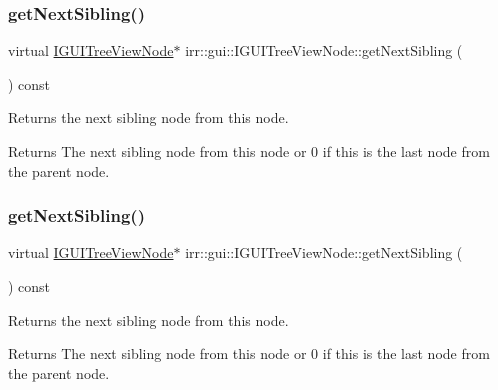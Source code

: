 \subsubsection{\texorpdfstring{get\+Next\+Sibling()}{getNextSibling()}\hspace{0.1cm}{\footnotesize\ttfamily [1/2]}}
{\footnotesize\ttfamily virtual \hyperlink{classirr_1_1gui_1_1IGUITreeViewNode}{I\+G\+U\+I\+Tree\+View\+Node}$\ast$ irr\+::gui\+::\+I\+G\+U\+I\+Tree\+View\+Node\+::get\+Next\+Sibling (\begin{DoxyParamCaption}{ }\end{DoxyParamCaption}) const\hspace{0.3cm}{\ttfamily [pure virtual]}}



Returns the next sibling node from this node. 

\begin{DoxyReturn}{Returns}
The next sibling node from this node or 0 if this is the last node from the parent node. 
\end{DoxyReturn}
\mbox{\label{classirr_1_1gui_1_1IGUITreeViewNode_a5f54e1386055ad0b45775ebefb1b5600}} 
\subsubsection{\texorpdfstring{get\+Next\+Sibling()}{getNextSibling()}\hspace{0.1cm}{\footnotesize\ttfamily [2/2]}}
{\footnotesize\ttfamily virtual \hyperlink{classirr_1_1gui_1_1IGUITreeViewNode}{I\+G\+U\+I\+Tree\+View\+Node}$\ast$ irr\+::gui\+::\+I\+G\+U\+I\+Tree\+View\+Node\+::get\+Next\+Sibling (\begin{DoxyParamCaption}{ }\end{DoxyParamCaption}) const\hspace{0.3cm}{\ttfamily [pure virtual]}}



Returns the next sibling node from this node. 

\begin{DoxyReturn}{Returns}
The next sibling node from this node or 0 if this is the last node from the parent node. 
\end{DoxyReturn}
\mbox{\label{classirr_1_1gui_1_1IGUITreeViewNode_add12cd0ee7b12a49c0f140741f9449fb}} 
